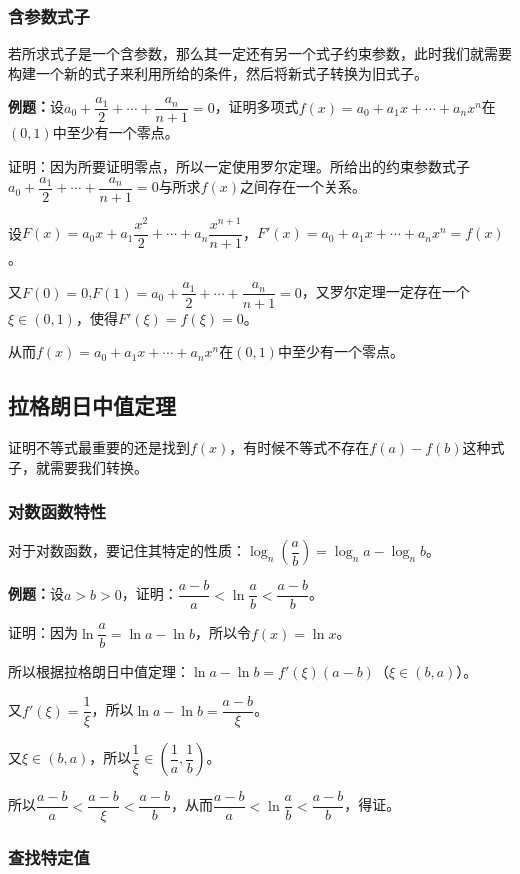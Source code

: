 \documentclass[UTF8, 12pt]{ctexart}
\begin{document}
\subsubsection{含参数式子}

若所求式子是一个含参数，那么其一定还有另一个式子约束参数，此时我们就需要构建一个新的式子来利用所给的条件，然后将新式子转换为旧式子。

\textbf{例题：}设$a_0+\dfrac{a_1}{2}+\cdots+\dfrac{a_n}{n+1}=0$，证明多项式$f(x)=a_0+a_1x+\cdots+a_nx^n$在$(0,1)$中至少有一个零点。

证明：因为所要证明零点，所以一定使用罗尔定理。所给出的约束参数式子$a_0+\dfrac{a_1}{2}+\cdots+\dfrac{a_n}{n+1}=0$与所求$f(x)$之间存在一个关系。

设$F(x)=a_0x+a_1\dfrac{x^2}{2}+\cdots+a_n\dfrac{x^{n+1}}{n+1}$，$F'(x)=a_0+a_1x+\cdots+a_nx^n=f(x)$。

又$F(0)=0$,$F(1)=a_0+\dfrac{a_1}{2}+\cdots+\dfrac{a_n}{n+1}=0$，又罗尔定理一定存在一个$\xi\in(0,1)$，使得$F'(\xi)=f(\xi)=0$。

从而$f(x)=a_0+a_1x+\cdots+a_nx^n$在$(0,1)$中至少有一个零点。

\subsection{拉格朗日中值定理}

证明不等式最重要的还是找到$f(x)$，有时候不等式不存在$f(a)-f(b)$这种式子，就需要我们转换。

\subsubsection{对数函数特性}

对于对数函数，要记住其特定的性质：$\log_n(\dfrac{a}{b})=\log_na-\log_nb$。

\textbf{例题：}设$a>b>0$，证明：$\dfrac{a-b}{a}<\ln\dfrac{a}{b}<\dfrac{a-b}{b}$。

证明：因为$\ln\dfrac{a}{b}=\ln a-\ln b$，所以令$f(x)=\ln x$。

所以根据拉格朗日中值定理：$\ln a-\ln b=f'(\xi)(a-b)$（$\xi\in(b,a)$）。

又$f'(\xi)=\dfrac{1}{\xi}$，所以$\ln a-\ln b=\dfrac{a-b}{\xi}$。

又$\xi\in(b,a)$，所以$\dfrac{1}{\xi}\in(\dfrac{1}{a},\dfrac{1}{b})$。

所以$\dfrac{a-b}{a}<\dfrac{a-b}{\xi}<\dfrac{a-b}{b}$，从而$\dfrac{a-b}{a}<\ln\dfrac{a}{b}<\dfrac{a-b}{b}$，得证。

\subsubsection{查找特定值}
\end{document}
